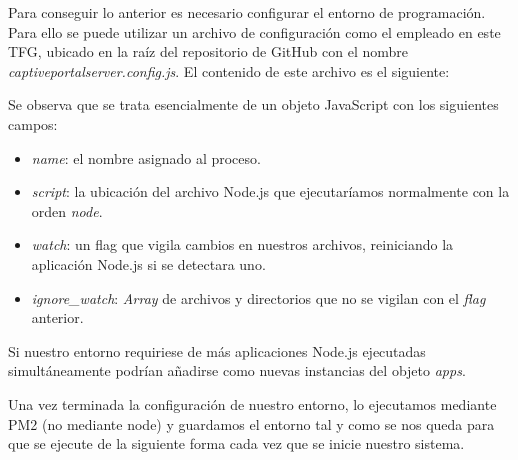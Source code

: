 \begin{appendices}
Para conseguir lo anterior es necesario configurar el entorno de programación. Para ello se puede utilizar un archivo de configuración como el empleado en este TFG, ubicado en la raíz del repositorio de GitHub con el nombre \emph{captiveportalserver.config.js}. El contenido de este archivo es el siguiente:


Se observa que se trata esencialmente de un objeto JavaScript con los siguientes campos:

\begin{itemize}
\item \emph{name}: el nombre asignado al proceso.
\item \emph{script}: la ubicación del archivo Node.js que ejecutaríamos normalmente con la orden \emph{node}.
\item \emph{watch}: un flag que vigila cambios en nuestros archivos, reiniciando la aplicación Node.js si se detectara uno.
\item \emph{ignore\_watch}: \emph{Array} de archivos y directorios que no se vigilan con el \emph{flag} anterior.
\end{itemize}

Si nuestro entorno requiriese de más aplicaciones Node.js ejecutadas simultáneamente podrían añadirse como nuevas instancias del objeto \emph{apps}.

Una vez terminada la configuración de nuestro entorno, lo ejecutamos mediante PM2 (no mediante node) y guardamos el entorno tal y como se nos queda para que se ejecute de la siguiente forma cada vez que se inicie nuestro sistema.



\end{appendices}
